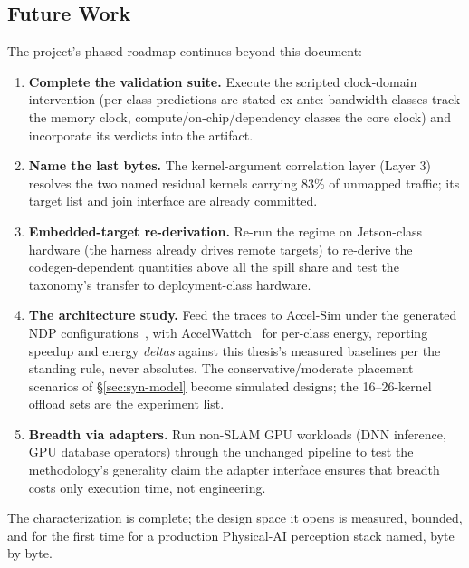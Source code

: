\subsection{Future Work}
\label{sec:roadmap}

The project's phased roadmap continues beyond this document:

\begin{enumerate}
    \item \textbf{Complete the validation suite.} Execute the scripted clock-domain intervention (per-class predictions are stated ex ante: bandwidth classes track the memory clock, compute/on-chip/dependency classes the core clock) and incorporate its verdicts into the artifact.
    \item \textbf{Name the last bytes.} The kernel-argument correlation layer (Layer 3) resolves the two named residual kernels carrying 83\% of unmapped traffic; its target list and join interface are already committed.
    \item \textbf{Embedded-target re-derivation.} Re-run the regime on Jetson-class hardware (the harness already drives remote targets) to re-derive the codegen-dependent quantities above all the spill share and test the taxonomy's transfer to deployment-class hardware.
    \item \textbf{The architecture study.} Feed the traces to Accel-Sim under the generated NDP configurations~\cite{khairy2020accelsim}, with AccelWattch~\cite{kandiah2021accelwattch} for per-class energy, reporting speedup and energy \emph{deltas} against this thesis's measured baselines per the standing rule, never absolutes. The conservative/moderate placement scenarios of \S\ref{sec:syn-model} become simulated designs; the 16--26-kernel offload sets are the experiment list.
    \item \textbf{Breadth via adapters.} Run non-SLAM GPU workloads (DNN inference, GPU database operators) through the unchanged pipeline to test the methodology's generality claim the adapter interface ensures that breadth costs only execution time, not engineering.
\end{enumerate}

The characterization is complete; the design space it opens is measured, bounded, and for the first time for a production Physical-AI perception stack named, byte by byte.
